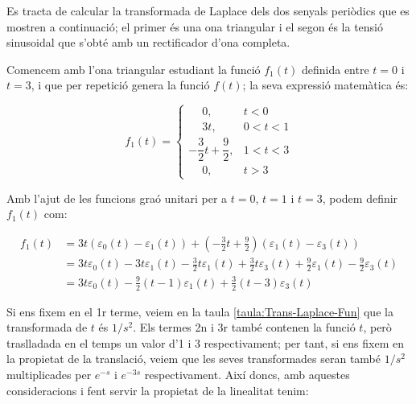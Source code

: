 	
\begin{exemple}[\CalcTransfLaplace{}]
	\addcontentsxms{\CalcTransfLaplace}
    Es tracta de calcular la transformada de Laplace dels dos
    senyals periòdics que es mostren a continuació; el primer és una
    ona triangular i el segon és la tensió sinusoidal que s'obté amb un
    rectificador d'ona completa.

    \begin{center}
        
    \end{center}

    Comencem amb l'ona triangular estudiant la funció $f_1(t)$ definida
    entre $t=0$ i $t=3$, i que per repetició genera la funció $f(t)$; la
    seva expressió matemàtica és:

    \[
        f_1(t) = \begin{cases}
        \phantom{-}0, & t < 0\\
        \phantom{-}3t, & 0<t<1 \\
        -\dfrac{3}{2}t +\dfrac{9}{2}, & 1 < t < 3 \\
        \phantom{-}0, & t > 3 \end{cases}
    \]

    Amb l'ajut de les funcions graó unitari per a $t=0$, $t=1$ i $t=3$,
    podem definir $f_1(t)$ com:

    \[\begin{split}
        f_1(t) &= 3t (\varepsilon_0(t) - \varepsilon_1(t)) + \left(-\frac{3}{2}t
        +\frac{9}{2}\right) (\varepsilon_1(t) -
        \varepsilon_3(t))  \\
        &=
        3t\varepsilon_0(t)-3t\varepsilon_1(t)-\frac{3}{2}t \varepsilon_1(t)
        +\frac{3}{2}t \varepsilon_3(t) +\frac{9}{2} \varepsilon_1(t)
        -\frac{9}{2} \varepsilon_3(t)  \\
        &=3t\varepsilon_0(t) -\frac{9}{2}(t-1)\varepsilon_1(t) +
        \frac{3}{2}(t-3)\varepsilon_3(t)
    \end{split}\]

    Si ens fixem en el 1r terme, veiem en la taula
    \vref{taula:Trans-Laplace-Fun} que la  transformada de $t$ és $1/s^2$.
    Els termes 2n i 3r també contenen la funció $t$, però traslladada
    en el temps un valor d'1 i 3 respectivament; per tant, si ens fixem
    en la propietat de la translació, veiem que les seves transformades
    seran també $1/s^2$ multiplicades per $e^{-s}$ i $e^{-3s}$
    respectivament. Així doncs, amb aquestes consideracions i fent
    servir la propietat de la linealitat tenim:


\end{exemple}
